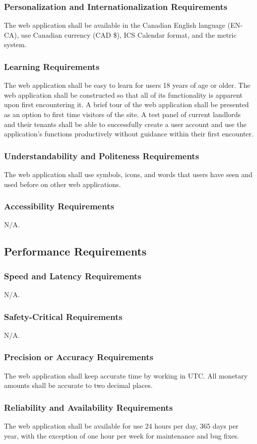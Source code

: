 \documentclass[12pt]{article}
\begin{document}
{\subsubsection{Personalization and Internationalization Requirements}
The web application shall be available in the Canadian English language (EN-CA),  use 
Canadian currency (CAD \$), ICS Calendar format, and the metric system.
\subsubsection{Learning Requirements}
The web application shall be easy to learn for users 18 years of age or older. The web 
application shall be constructed so that all of its functionality is apparent 
upon first encountering it. A brief tour of the web application shall be 
presented as an option to first time visitors of the site. A test panel of 
current landlords and their tenants shall be able to successfully create a user 
account and use the application's functions productively without guidance within 
their first encounter.
\subsubsection{Understandability and Politeness Requirements}
The web application shall use symbols, icons, and words that users have seen and used before on other web applications.
\subsubsection{Accessibility Requirements}
N/A.
\subsection{Performance Requirements}
\subsubsection{Speed and Latency Requirements}
N/A.
\subsubsection{Safety-Critical Requirements}
N/A.
\subsubsection{Precision or Accuracy Requirements}
The web application shall keep accurate time by working in UTC. All monetary 
amounts shall be accurate to two decimal places. 
\subsubsection{Reliability and Availability Requirements}
The web application shall be available for use 24 hours per day, 365 days per 
year, with the exception of one hour per week for maintenance and bug fixes.
}
\end{document}
